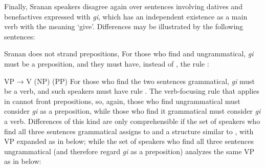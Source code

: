 Finally, Sranan speakers disagree again over sentences involving datives and benefactives expressed with \textit{gi}, which has an independent existence as a main verb with the meaning `give'. Differences may be illustrated by the following sentences:

\z
{}
\z
{}
\z
{}
\z
{}
\z
{}
\z

Sranan does not strand prepositions, For those who find  and  ungrammatical, \textit{gi} must be a preposition, and they must have, instead of , the rule :

\ea\label{ex:2:259}
 VP → V (NP) (PP)
\glt
\z
For those who find the two sentences grammatical, \textit{gi} must be a verb, and such speakers must have rule . The verb-focusing rule that applies in  cannot front prepositions, so, again, those who find  ungrammatical must consider \textit{gi} as a preposition, while those who find it grammatical must consider \textit{gi} a verb. Differences of this kind are only comprehensible if the set of speakers who find all three sentences grammatical assigns to  and  a structure similar to , with VP expanded as in  below; while the set of speakers who find all three sentences ungrammatical (and therefore regard \textit{gi} as a preposition) analyzes the same VP as in  below:

